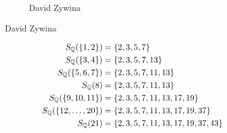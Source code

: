 \begin{frame}[plain]
\begin{figure}[h]
\begin{subfigure}{0.3\textwidth}
	\caption{\hspace{0.1cm}David Zywina}
	\end{subfigure}
	\end{figure}
\end{frame}



\begin{frame}[plain]
\end{frame}



\begin{frame}[plain]
	\begin{thm}
		\[
		\begin{split}
		S_{\mathbb{Q}}(\{1,2\})&= \{ 2,3,5,7 \} \\
		S_{\mathbb{Q}}(\{3,4\})&= \{ 2,3,5,7,13 \} \\
		S_{\mathbb{Q}}(\{5,6,7\})&= \{ 2,3,5,7,11,13 \} \\
		S_{\mathbb{Q}}(8)&= \{ 2,3,5,7,11,13 \} \\
		S_{\mathbb{Q}}(\{9,10,11\})&= \{ 2,3,5,7,11,13,17,19 \} \\
		S_{\mathbb{Q}}(\{12,\ldots,20\})&= \{2,3,5,7,11,13,17,19,37 \} \\
		S_{\mathbb{Q}}(21)&= \{ 2,3,5,7,11,13,17,19,37,43 \}
		\end{split}
		\]
	\end{thm}
\end{frame}



